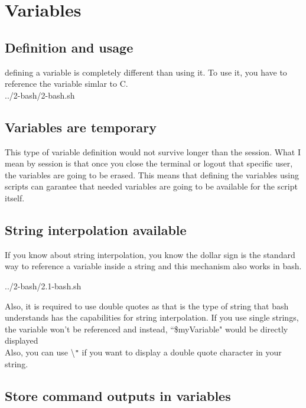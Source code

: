 \chapter{Variables}

\section{Definition and usage}

defining a variable is completely different than using it. To use it, you have to reference the variable
simlar to C.\\


{../2-bash/2-bash.sh}

\section{Variables are temporary}

This type of variable definition would not survive longer than the session. What I mean by session
is that once you close the terminal or logout that specific user, the variables are going to be erased.
This means that defining the variables using scripts can garantee that needed variables are going to 
be available for the script itself.

\section{String interpolation available}

If you know about string interpolation, you know the dollar sign is the standard way to reference a 
variable inside a string and this mechanism also works in bash.


{../2-bash/2.1-bash.sh}


Also, it is required to use double quotes as that is the type of string that bash understands
has the capabilities for string interpolation. If you use single strings, the variable won't be
referenced and instead, ``\$myVariable" would be directly displayed \\

Also, you can use \textbackslash{}\texttt{"} if you want to display a double quote character in your string.

\section{Store command outputs in variables}

